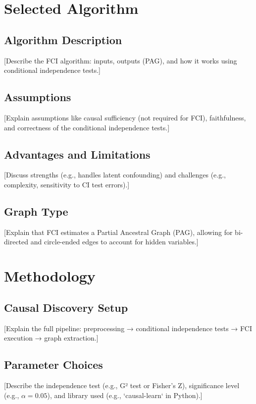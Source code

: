 \documentclass[a4paper]{article}
\begin{document}
\section{Selected Algorithm}
\label{sec:algorithm}

\subsection{Algorithm Description}
[Describe the FCI algorithm: inputs, outputs (PAG), and how it works using conditional independence tests.]

\subsection{Assumptions}
[Explain assumptions like causal sufficiency (not required for FCI), faithfulness, and correctness of the conditional independence tests.]

\subsection{Advantages and Limitations}
[Discuss strengths (e.g., handles latent confounding) and challenges (e.g., complexity, sensitivity to CI test errors).]

\subsection{Graph Type}
[Explain that FCI estimates a Partial Ancestral Graph (PAG), allowing for bi-directed and circle-ended edges to account for hidden variables.]



\section{Methodology}
\label{sec:methodology}

\subsection{Causal Discovery Setup}
[Explain the full pipeline: preprocessing → conditional independence tests → FCI execution → graph extraction.]

\subsection{Parameter Choices}
[Describe the independence test (e.g., G² test or Fisher's Z), significance level (e.g., $\alpha = 0.05$), and library used (e.g., `causal-learn` in Python).]
\end{document}
